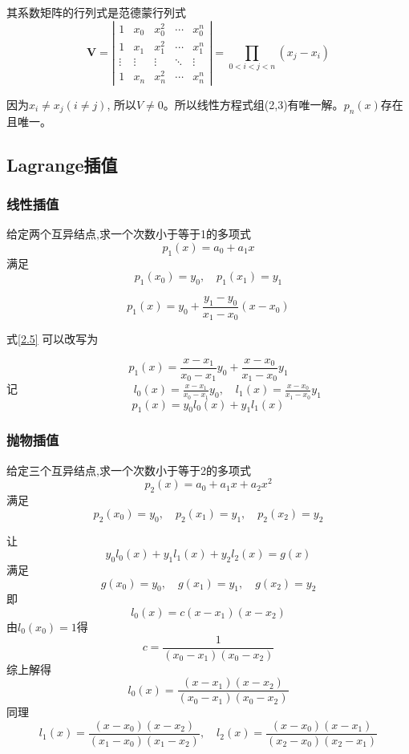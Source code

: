 \documentclass[12pt]{report}
\numberwithin{equation}{section}
\begin{document}
	其系数矩阵的行列式是范德蒙行列式
	\begin{equation}
		\boldsymbol{V}=\left|\begin{array}{ccccc}
		1 & x_{0} & x_{0}^{2} & \cdots & x_{0}^{n} \\
		1 & x_{1} & x_{1}^{2} & \cdots & x_{1}^{n} \\
		\vdots & \vdots & \vdots & \ddots & \vdots \\
		1 & x_{n} & x_{n}^{2} & \cdots & x_{n}^{n}
		\end{array}\right|=\prod_{0<i<j<n}\left(x_{j}-x_{i}\right)
	\end{equation}

	因为$x_i \neq x_j (i \neq j)$, 所以$V \neq 0$。所以线性方程式组(2,3)有唯一解。$p_n(x)$存在且唯一。

	\subsection{Lagrange插值}

	\subsubsection{线性插值}
	给定两个互异结点,求一个次数小于等于1的多项式
	$$
	p_1 (x) = a_0 + a_1 x
	$$
	满足
	$$
	p_1 (x_0) = y_0 , \quad p_1 (x_1) = y_1
	$$

	\begin{equation} \tag{2.5} \label{2.5}
		p_1 (x) = y_0 + \frac{y_1 - y_0}{x_1 - x_0} (x - x_0)
	\end{equation}

	式\eqref{2.5} 可以改写为

	\begin{equation} \tag{2.6} \label{2.6}
		p_1 (x) = \frac{x - x_1}{x_0 - x_1} y_0 + \frac{x - x_0}{x_1 - x_0} y_1
	\end{equation}
	记 $\quad \quad \quad \quad \quad \quad \quad \quad \quad \quad l_0 (x) = \frac{x - x_1}{x_0 - x_1} y_0 , \quad l_1 (x) = \frac{x - x_0}{x_1 - x_0} y_1$
	$$
	p_1 (x) = y_0 l_0 (x) + y_1 l_1 (x)
	$$

	\subsubsection{抛物插值}
	给定三个互异结点,求一个次数小于等于2的多项式
	$$
	p_2 (x) = a_0 + a_1 x + a_2 x^2
	$$
	满足
	$$
	p_2 (x_0) = y_0 , \quad p_2 (x_1) = y_1 , \quad p_2 (x_2) = y_2
	$$
	
	让
	$$
	y_0 l_0 (x) + y_1 l_1 (x) + y_2 l_2 (x) = g(x)
	$$
	满足
	$$
	g(x_0) = y_0 , \quad g(x_1) = y_1 , \quad g(x_2) = y_2
	$$
	即
	$$
	l_0 (x) = c(x - x_1)(x - x_2)
	$$
	由$l_0 (x_0) = 1$得
	$$
	c = \frac{1}{(x_0 - x_1)(x_0 - x_2)}
	$$
	综上解得
	$$
	l_0 (x) = \frac{(x - x_1)(x - x_2)}{(x_0 - x_1)(x_0 - x_2)}
	$$
	同理
	$$
	l_1 (x) = \frac{(x - x_0)(x - x_2)}{(x_1 - x_0)(x_1 - x_2)} , \quad l_2 (x) = \frac{(x - x_0)(x - x_1)}{(x_2 - x_0)(x_2 - x_1)}
	$$
\end{document}
